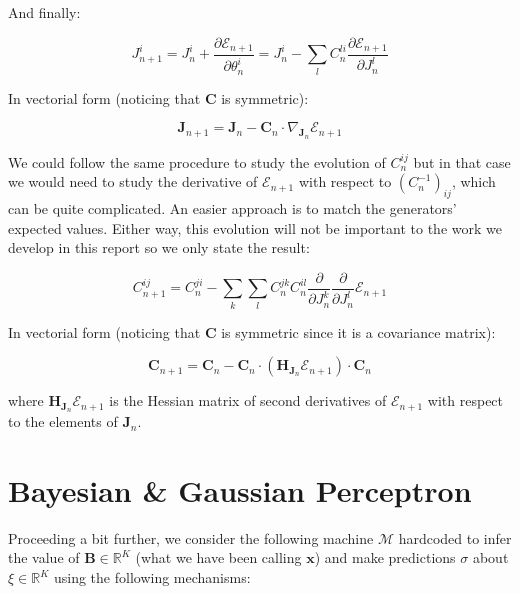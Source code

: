 \documentclass[12pt,a4paperpaper,]{tufte-book}
\begin{document}
And finally:

\begin{equation} J^{i}_{n+1} = J^{i}_n + \frac{\partial \mathcal{E}_{n+1}}{\partial \theta^i_n} = J^{i}_n - \sum_l C^{li}_n \frac{\partial \mathcal{E}_{n+1}}{\partial J^{l}_n}\label{eq:upstudenti}\end{equation}

In vectorial form (noticing that \(\mathbf{C}\) is symmetric):

\begin{equation} \mathbf{J}_{n+1} = \mathbf{J}_n - \mathbf{C}_n \cdot \nabla_{\mathbf{J}_n} \mathcal{E}_{n+1}\label{eq:upstudent}\end{equation}

We could follow the same procedure to study the evolution of \(C^{ij}_n\) but in that case we would need to study the derivative of \(\mathcal{E}_{n+1}\) with respect to \(\left(C^{-1}_n\right)_{ij}\), which can be quite complicated. An easier approach is to match the generators' expected values. Either way, this evolution will not be important to the work we develop in this report so we only state the result:

\begin{equation} C^{ij}_{n+1} = C_n^{ji} - \sum_k \sum_l  C_n^{jk} C_n^{il} \frac{\partial}{\partial J^{k}_n} \frac{\partial}{\partial J^{l}_n} \mathcal{E}_{n+1}\label{eq:upcij}\end{equation}

In vectorial form (noticing that \(\mathbf{C}\) is symmetric since it is a covariance matrix):

\begin{equation} \mathbf{C}_{n+1} = \mathbf{C}_n - \mathbf{C}_n \cdot \left( \mathbf{H}_{\mathbf{J}_n} \mathcal{E}_{n+1} \right) \cdot \mathbf{C}_n \label{eq:upc}\end{equation}

where \(\mathbf{H}_{\mathbf{J}_n} \mathcal{E}_{n+1}\) is the Hessian matrix of second derivatives of \(\mathcal{E}_{n+1}\) with respect to the elements of \(\mathbf{J}_n\).

\hypertarget{sec:bayesgaussperceptron}{%
\section{Bayesian \& Gaussian Perceptron}\label{sec:bayesgaussperceptron}}

Proceeding a bit further, we consider the following machine \(\mathcal{M}\) hardcoded to infer the value of \(\mathbf{B}\in \mathbb{R}^K\) (what we have been calling \(\mathbf{x}\)) and make predictions \(\sigma\) about \(\xi \in \mathbb{R}^K\) using the following mechanisms:
\end{document}

